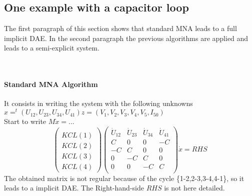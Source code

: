  
\subsection{One  example with  a capacitor  loop}

The first paragraph of this section shows that standard MNA leads to a full implicit DAE. In the second
paragraph the previous algorithms are applied and leads to a semi-explicit system.
\begin{figure}[h]
\centerline{
 \scalebox{0.6}{
    
 }
}\end{figure}\\


\paragraph{Standard MNA Algorithm}
It consists in writing the system with the following unknowns $x=^{t}(U_{12},U_{23},U_{34},U_{41})$$z=(V_{1},V_{2},V_{3},V_{4},V_{5},I_{50})$\\
Start to write $M \dot x=...$\
\[\left(\begin{array}{c}
  \\
KCL(1)\\KCL(2)\\KCL(3)\\KCL(4)
\end{array}\right)
\left(\begin{array}{cccc}
  \dot U_{12}&\dot U_{23}&\dot U_{34}&\dot U_{41}\\
  \hline
  C&0&0&-C\\
  -C&C&0&0\\
  0&-C&C&0\\
  0&0&-C&C\\  
\end{array}\right) \dot x= RHS
\]
The obtained matrix is not regular because of the cycle \{1-2,2-3,3-4,4-1\}, so it leads to a
implicit DAE. The Right-hand-side  $RHS$ is not here detailed. 



